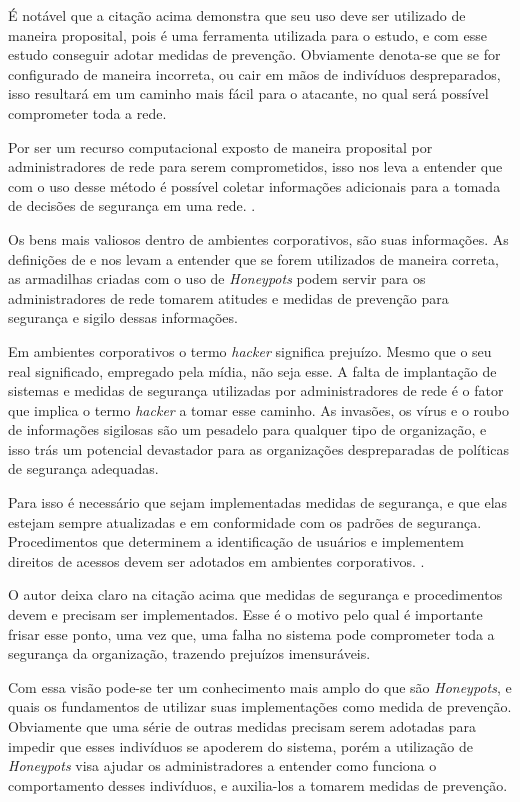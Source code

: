 É notável que a citação acima demonstra que seu uso deve ser utilizado de maneira proposital, pois é uma ferramenta utilizada para o estudo, e com esse estudo conseguir adotar medidas de prevenção. Obviamente denota-se que se for configurado de maneira incorreta, ou cair em mãos de indivíduos despreparados, isso resultará em um caminho mais fácil para o atacante, no qual será possível comprometer toda a rede.

Por ser um recurso computacional exposto de maneira proposital por administradores de rede para serem comprometidos, isso nos leva a entender que com o uso desse método é possível coletar informações adicionais para a tomada de decisões de segurança em uma rede. \cite{spitzner2003}.

Os bens mais valiosos dentro de ambientes corporativos, são suas informações. As definições de  e  nos levam a entender que se forem utilizados de maneira correta, as armadilhas criadas com o uso de \textit{Honeypots} podem servir para os administradores de rede tomarem atitudes e medidas de prevenção para segurança e sigilo dessas informações.

Em ambientes corporativos o termo \textit{hacker} significa prejuízo. Mesmo que o seu real significado, empregado pela mídia, não seja esse. A falta de implantação de sistemas e medidas de segurança utilizadas por administradores de rede é o fator que implica o termo \textit{hacker} a tomar esse caminho. As invasões, os vírus e o roubo de informações sigilosas são um pesadelo para qualquer tipo de organização, e isso trás um potencial devastador para as organizações despreparadas de políticas de segurança adequadas.

Para isso é necessário que sejam implementadas medidas de segurança, e que elas estejam sempre atualizadas e em conformidade com os padrões de segurança. Procedimentos que determinem a identificação de usuários e implementem direitos de acessos devem ser adotados em ambientes corporativos. \cite{fontes2012}.

O autor deixa claro na citação acima que medidas de segurança e procedimentos devem e precisam ser implementados. Esse é o motivo pelo qual é importante frisar esse ponto, uma vez que, uma falha no sistema pode comprometer toda a segurança da organização, trazendo prejuízos imensuráveis.

Com essa visão pode-se ter um conhecimento mais amplo do que são \textit{Honeypots}, e quais os fundamentos de utilizar suas implementações como medida de prevenção. Obviamente que uma série de outras medidas precisam serem adotadas para impedir que esses indivíduos se apoderem do sistema, porém a utilização de \textit{Honeypots} visa ajudar os administradores a entender como funciona o comportamento desses indivíduos, e auxilia-los a tomarem medidas de prevenção.

